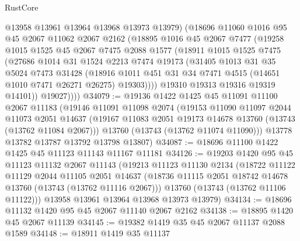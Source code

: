 \begin{lexlean}{RustCore}
\begin{coremodule}
            @13958
            @13961
            @13964
            @13968
            @13973
            @13979)
          (@18696
            @11060
            @1016
            @95
            @45
            @2067
            @11062
            @2067
            @2162
            (@18895
              @1016
              @45
              @2067
              @7477
              (@19258
                @1015
                @1525
                @45
                @2067
                @7475
                @2088
                @1577
                (@18911
                  @1015
                  @1525
                  @7475
                  (@27686
                    @1014
                    @31
                    @1524
                    @2213
                    @7474
                    @19173
                    (@31405
                      @1013
                      @31
                      @35
                      @5024
                      @7473
                      @31428
                      (@18916
                        @1011
                        @451
                        @31
                        @34
                        @7471
                        @4515
                        (@14651 @1010 @7471 @26271 @26275)
                        @19303))))
                @19310
                @19313
                @19316
                @19319
                @14101))
            @19027))))
@34079 := @19136
    @1422
    @1425
    @45
    @11091
    @11100
    @2067
    @11183
    (@19146
      @11091
      @11098
      @2074
      (@19153
        @11090
        @11097
        @2044
        @11073
        @2051
        @14637
        (@19167 @11083 @2051 @19173 @14678 @13760 (@13743 (@13762 @11084 @2067)))
        @13760
        (@13743 (@13762 @11074 @11090)))
      @13778
      @13782
      @13787
      @13792
      @13798
      @13807)
@34087 := @18696 @11100 @1422 @1425 @45 @11123 @11143 @11167 @11181
@34126 := @19203
    @1420
    @95
    @45
    @11123
    @11132
    @2067
    @11143
    (@19213
      @11123
      @11130
      @2134
      (@18722
        @11122
        @11129
        @2044
        @11105
        @2051
        @14637
        (@18736 @11115 @2051 @18742 @14678 @13760 (@13743 (@13762 @11116 @2067)))
        @13760
        (@13743 (@13762 @11106 @11122)))
      @13958
      @13961
      @13964
      @13968
      @13973
      @13979)
@34134 := @18696 @11132 @1420 @95 @45 @2067 @11140 @2067 @2162
@34138 := @18895 @1420 @45 @2067 @11139
@34145 := @19382 @1419 @35 @45 @2067 @11137 @2088 @1589
@34148 := @18911 @1419 @35 @11137

\end{coremodule}
\end{lexlean}
